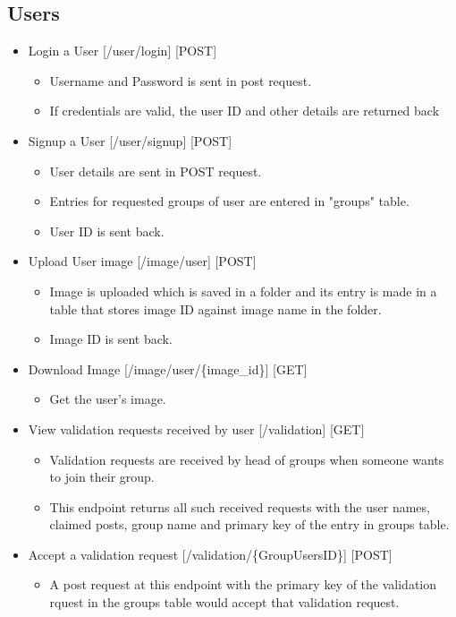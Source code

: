 \documentclass[12pt]{article}
\begin{document}
\subsection{Users}
\begin{itemize}
\setlength\itemsep{-0.4em}
\item Login a User [/user/login] [POST]
\begin{itemize}
\setlength\itemsep{-0.4em}
\item Username and Password is sent in post request.
\item If credentials are valid, the user ID and other details are returned back
\end{itemize}
\item Signup a User [/user/signup] [POST]
\begin{itemize}
\setlength\itemsep{-0.4em}
\item User details are sent in POST request.
\item Entries for requested groups of user are entered in "groups" table.
\item User ID is sent back.
\end{itemize}
\item Upload User image [/image/user] [POST]
\begin{itemize}
\setlength\itemsep{-0.4em}
\item Image is uploaded which is saved in a folder and its entry is made in a table that stores image ID against image name in the folder.
\item Image ID is sent back.
\end{itemize}
\item Download Image [/image/user/\{image\_id\}] [GET]
\begin{itemize}
\setlength\itemsep{-0.4em}
\item Get the user's image.
\end{itemize}
\item View validation requests received by user [/validation] [GET]
\begin{itemize}
\setlength\itemsep{-0.4em}
\item Validation requests are received by head of groups when someone wants to join their group.
\item This endpoint returns all such received requests with the user names, claimed posts, group name and primary key of the entry in groups table.
\end{itemize}
\item Accept a validation request [/validation/\{GroupUsersID\}] [POST]
\begin{itemize}
\setlength\itemsep{-0.4em}
\item A post request at this endpoint with the primary key of the validation rquest in the groups table would accept that validation request.
\end{itemize}
\end{itemize}
\end{document}
